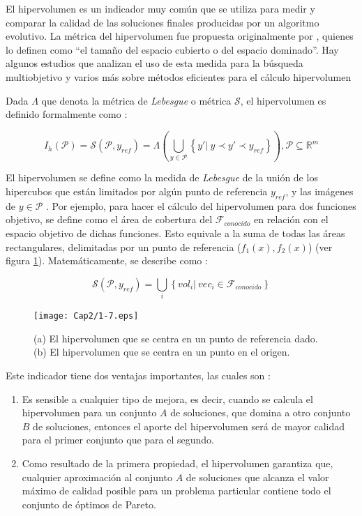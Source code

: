   El hipervolumen es un indicador muy com\'un que se utiliza para medir y comparar la calidad de las soluciones
  finales producidas por un algoritmo evolutivo. La m\'etrica del hipervolumen fue propuesta originalmente por
  \cite{Zitzler98on}, quienes lo definen como ``el tama\~no del espacio cubierto o del espacio dominado''. Hay algunos 
  estudios que analizan el uso de esta medida para la b\'usqueda multiobjetivo y varios m\'as sobre m\'etodos eficientes para 
  el c\'alculo hipervolumen \cite{FonPaqhypervolume, BeuFon2009, Emmerich05anemo}

   \begin{definicion}  Dada $\Lambda$ que denota la m\'etrica de \textit{Lebesgue} 
   o m\'etrica $\mathcal{S}$, el hipervolumen es definido formalmente como \cite{EASMC}:

  \[
  I_h\left(\mathcal{P}\right) = \mathcal{S}(\mathcal{P},y_{ref}) = \Lambda \left(\bigcup_{y \in \mathcal{P}} \left\{ y' |~ y \prec y' \prec y_{ref} \right\} \right), 
  \mathcal{P} \subseteq \mathbb{R}^m
  \]
  
  El hipervolumen se define como la medida de \textit{Lebesgue} de la uni\'on de los hipercubos que est\'an limitados 
  por alg\'un punto de referencia $y_{ref}$, y las im\'agenes de $y \in \mathcal{P}$ \cite{zbt2006}. Por ejemplo,  para hacer el  
  c\'alculo del hipervolumen para dos funciones objetivo, se define como el \'area de cobertura del 
  $\mathcal{F}_{conocido}$ en  relaci\'on con el espacio objetivo de dichas funciones. Esto equivale a la suma de todas las \'areas 
  rectangulares, delimitadas por un punto de referencia ($f_1\left(x \right), f_2\left(x\right)$) (ver figura \ref{fig:hipervol}). 
  Matem\'aticamente, se describe como \cite{EASMC}:

 \[
  \mathcal{S}(\mathcal{P},y_{ref}) = \bigcup_{i} \left\{vol_i |~ vec_i \in \mathcal{F}_{conocido} \right\}
  \]
  \end{definicion}
  
 \begin{figure}
	\centering
	\texttt{[image: Cap2/1-7.eps]}
	  \caption [Hipervolumen por punto de referencia]{(a) El hipervolumen que se centra en un punto de referencia dado. 
	  (b) El hipervolumen que se centra en un punto en el origen.}
      \label{fig:hipervol}
      \end{figure}
 
  Este indicador tiene dos ventajas importantes, las cuales son \cite{zbt2006}:
  
  \begin{enumerate}
   \item  Es sensible a cualquier tipo de mejora, es decir, cuando se calcula el hipervolumen para un conjunto $A$ 
   de soluciones, que domina a otro conjunto $B$ de soluciones, entonces el aporte del hipervolumen ser\'a de mayor 
   calidad para el primer conjunto que para el segundo.
   \item Como resultado de la primera propiedad, el hipervolumen garantiza que, cualquier aproximaci\'on al conjunto 
   $A$ de soluciones que alcanza el valor m\'aximo de calidad posible para un problema particular contiene todo el 
   conjunto de \'optimos de Pareto. 
  \end{enumerate}


